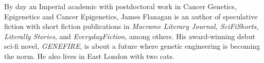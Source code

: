 By day an Imperial academic with postdoctoral work in Cancer Genetics, Epigenetics and Cancer Epigenetics, James Flanagan is an author of speculative fiction with short fiction publications in \emph{Macrame Literary Journal, SciFiShorts, Literally Stories}, and \emph{EverydayFiction}, among others. His award-winning debut sci-fi novel, \emph{GENEFIRE}, is about a future where genetic engineering is becoming the norm. He also lives in East London with two cats.